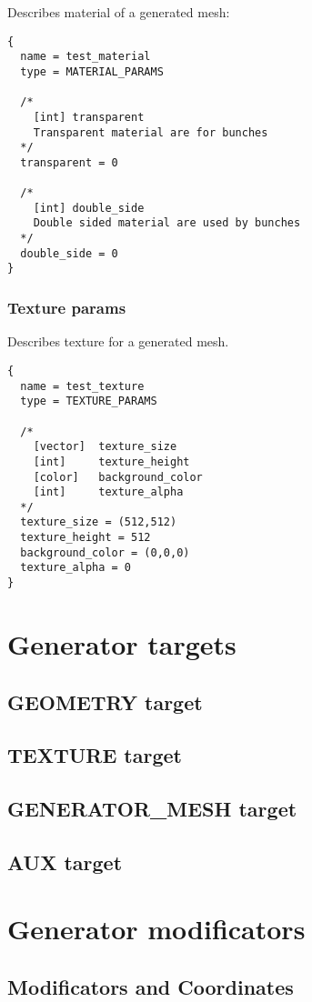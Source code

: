 \documentclass[11pt]{article}
\begin{document}
Describes material of a generated mesh:

\begin{verbatim}
{
  name = test_material
  type = MATERIAL_PARAMS
  
  /*
    [int] transparent
    Transparent material are for bunches
  */
  transparent = 0
  
  /*
    [int] double_side
    Double sided material are used by bunches
  */
  double_side = 0  
}
\end{verbatim}

\subsubsection{Texture params}

Describes texture for a generated mesh.

\begin{verbatim}
{
  name = test_texture
  type = TEXTURE_PARAMS

  /*
    [vector]  texture_size
    [int]     texture_height
    [color]   background_color
    [int]     texture_alpha
  */
  texture_size = (512,512)  
  texture_height = 512
  background_color = (0,0,0)
  texture_alpha = 0
}
\end{verbatim}

\section{Generator targets}
\subsection{GEOMETRY target}
\subsection{TEXTURE target}
\subsection{GENERATOR\_MESH target}
\subsection{AUX target}

\section{Generator modificators}

\subsection{Modificators and Coordinates}
\end{document}
